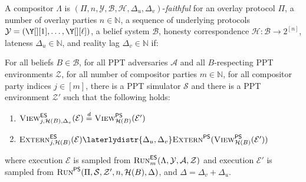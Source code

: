 \begin{definition}\label{def:faithfulness}
  A compositor $\Lambda$
  is $(\Pi,\allowbreak n,\allowbreak \mathcal{Y},\allowbreak \mathcal{B},\allowbreak \mathcal{H},\allowbreak \Delta_u,\allowbreak \Delta_v)$-\emph{faithful}
  for an overlay protocol $\Pi$,
  a number of overlay parties $n \in \mathbb{N}$,
  a sequence of underlying protocols $\mathcal{Y} = (\Y[][1], \ldots, \Y[][\ell])$,
  a belief system $\mathcal{B}$,
  honesty correspondence $\mathcal{H}: \mathcal{B} \longrightarrow 2^{[n]}$,
  lateness $\Delta_u \in \mathbb{N}$,
  and reality lag $\Delta_v \in \mathbb{N}$
  if:

  For all beliefs $B \in \mathcal{B}$,
  for all PPT adversaries $\mathcal{A}$ and all
  $B$-respecting PPT environments $\mathcal{Z}$,
  for all number of compositor parties $m \in \mathbb{N}$,
  for all compositor party indices $j \in [m]$,
  there is a PPT simulator $\mathcal{S}$ and there is a
  PPT environment $\mathcal{Z}'$ such that
  the following holds:

  \begin{enumerate}
    \item $\LCView_{j,\mathcal{H}(B),\Delta_v}(\mathcal{E}) \distreq \PEView_{\mathcal{H}(B)}(\mathcal{E}')$
    \item $\LCExtern_{j,\mathcal{H}(B)}(\mathcal{E}) \laterlydistr{\Delta_u,\Delta_v} \PEExtern(\PEView_{\mathcal{H}(B)}(\mathcal{E}'))$
  \end{enumerate}

  where execution $\mathcal{E}$ is sampled from
  $\textsc{Run}^{\textsf{ES}}_m(\Lambda, \mathcal{Y}, \mathcal{A}, \mathcal{Z})$
  and execution $\mathcal{E}'$ is sampled from
  $\textsc{Run}^{\textsf{PS}}(\Pi, \mathcal{S}, \mathcal{Z}', n, \mathcal{H}(B), \Delta)$,
  and $\Delta = \Delta_v + \Delta_u$.
\end{definition}

